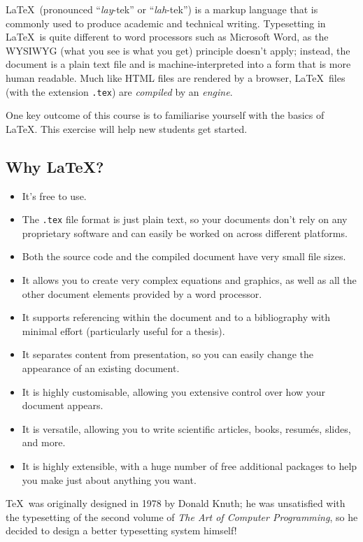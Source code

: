 \documentclass[12pt]{article}
\begin{document}

\LaTeX\ (pronounced ``\emph{lay}-tek'' or ``\emph{lah}-tek'') is a markup language that is commonly used to produce academic and technical writing. Typesetting in \LaTeX\ is quite different to word processors such as Microsoft Word, as the WYSIWYG (what you see is what you get) principle doesn't apply; instead, the document is a plain text file and is machine-interpreted into a form that is more human readable. Much like HTML files are rendered by a browser, \LaTeX\ files (with the extension \texttt{.tex}) are \emph{compiled} by an \emph{engine}.

One key outcome of this course is to familiarise yourself with the basics of \LaTeX. This exercise will help new students get started.

\subsection*{Why \LaTeX?}

\begin{itemize}
\item It's free to use.
\item The \texttt{.tex} file format is just plain text, so your documents don't rely on any proprietary software and can easily be worked on across different platforms.
\item Both the source code and the compiled document have very small file sizes.
\item It allows you to create very complex equations and graphics, as well as all the other document elements provided by a word processor.
\item It supports referencing within the document and to a bibliography with minimal effort (particularly useful for a thesis).
\item It separates content from presentation, so you can easily change the appearance of an existing document.
\item It is highly customisable, allowing you extensive control over how your document appears.
\item It is versatile, allowing you to write scientific articles, books, resum\'{e}s, slides, and more.
\item It is highly extensible, with a huge number of free additional packages to help you make just about anything you want.
\end{itemize}

\TeX\ was originally designed in 1978 by Donald Knuth; he was unsatisfied with the typesetting of the second volume of \textit{The Art of Computer Programming}, so he decided to design a better typesetting system himself!
\end{document}
